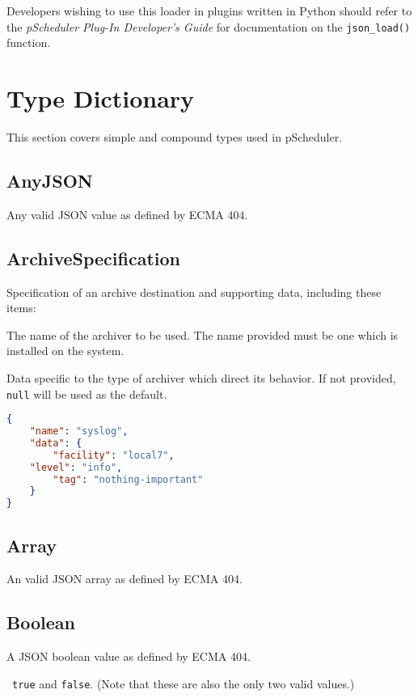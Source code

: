 \documentclass[10pt]{article}
\begin{document}
Developers wishing to use this loader in plugins written in Python
should refer to the {\it pScheduler Plug-In Developer's Guide} for
documentation on the {\tt json_load()} function.  


%
%

\section{Type Dictionary}

This section covers simple and compound types used in pScheduler.


\subsection{AnyJSON}
Any valid JSON value as defined by ECMA 404.



\subsection{ArchiveSpecification}
Specification of an archive destination and supporting data, including these items:

 The name of the archiver to be used.  The
name provided must be one which is installed on the system.

 Data specific to the type of archiver which
direct its behavior.  If not provided, {\tt null} will be used as the
default.

\example
\begin{lstlisting}[language=json]
{
    "name": "syslog",
    "data": {
        "facility": "local7",
	"level": "info",
        "tag": "nothing-important"
    }
}
\end{lstlisting}



\subsection{Array}
An valid JSON array as defined by ECMA 404.


\subsection{Boolean}
A JSON boolean value as defined by ECMA 404.

\example\ {\tt true} and {\tt false}.  (Note that these are also
the only two valid values.)
\end{document}

